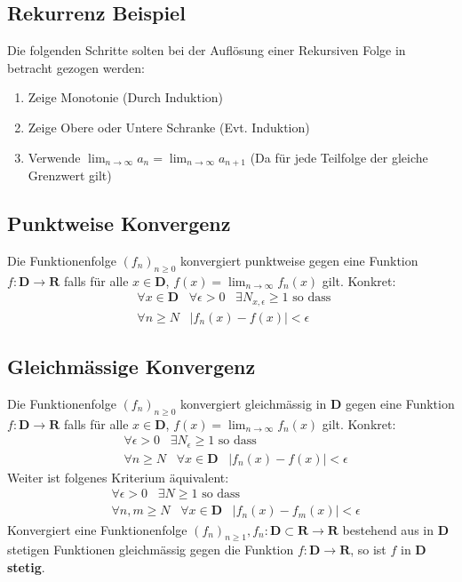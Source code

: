 \documentclass[8pt]{article}
\begin{document}
\begin{multicols*}{3}
  \subsection {Rekurrenz Beispiel}
Die folgenden Schritte solten bei der Auflösung einer Rekursiven Folge in betracht gezogen werden:
\begin{enumerate}
  \item Zeige Monotonie (Durch Induktion)
  \item Zeige Obere oder Untere Schranke (Evt. Induktion)
  \item Verwende $\lim_{n \rightarrow \infty} a_n = \lim_{n \rightarrow \infty} a_{n + 1}$ (Da für jede Teilfolge der gleiche Grenzwert gilt)
\end{enumerate}
 \subsection{Punktweise Konvergenz}
Die Funktionenfolge $(f_n)_{n \geq 0}$ konvergiert punktweise gegen eine Funktion
$f:\mathbf{D} \rightarrow \mathbf{R}$ falls für alle $x \in \mathbf{D}$, $f(x) = \lim_{n \rightarrow \infty} f_n(x)$ gilt. Konkret:
\begin{align*}
  &\forall x \in \mathbf{D} \;\;\; \forall \epsilon > 0 \;\;\; \exists N_{x, \epsilon} \geq 1 \text{ so dass }\\
  &\forall n \geq N \;\;\; |f_n(x) - f(x)| < \epsilon
\end{align*}
 \subsection{Gleichmässige Konvergenz}
Die Funktionenfolge $(f_n)_{n \geq 0}$ konvergiert gleichmässig in $\mathbf{D}$ gegen eine Funktion
$f:\mathbf{D} \rightarrow \mathbf{R}$ falls für alle $x \in \mathbf{D}$, $f(x) = \lim_{n \rightarrow \infty} f_n(x)$ gilt. Konkret:
\begin{align*}
  &\forall \epsilon > 0 \;\;\; \exists N_{\epsilon} \geq 1 \text{ so dass }\\
  &\forall n \geq N \;\;\;\forall x \in \mathbf{D} \;\;\; |f_n(x) - f(x)| < \epsilon
\end{align*}
Weiter ist folgenes Kriterium äquivalent:
\begin{align*}
  &\forall \epsilon > 0 \;\;\; \exists N \geq 1 \text{ so dass }\\
  &\forall n, m \geq N \;\;\;\forall x \in \mathbf{D} \;\;\; |f_n(x) - f_m(x)| < \epsilon
\end{align*}
Konvergiert eine Funktionenfolge $(f_n)_{n \geq 1}, f_n:\mathbf{D} \subset \mathbf{R} \rightarrow \mathbf{R}$
bestehend aus in $\mathbf{D}$ stetigen Funktionen gleichmässig gegen die Funktion $f:\mathbf{D} \rightarrow \mathbf{R}$, so
ist $f$ in $\mathbf{D}$ \textbf{stetig}.

\end{multicols*}
\end{document}
